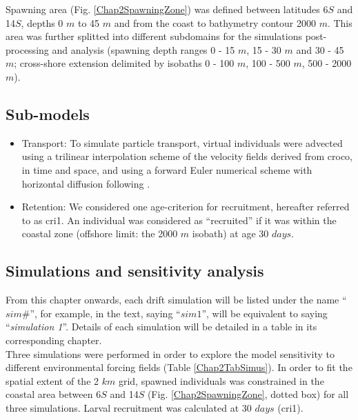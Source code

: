 Spawning area (Fig. \ref{Chap2SpawningZone}) was defined between latitudes 6\textdegree $S$ and 14\textdegree $S$, depths 0 $m$ to 45 $m$ and from the coast to bathymetry contour 2000 $m$. This area was further splitted into different subdomains for the simulations post-processing and analysis (spawning depth ranges 0 - 15 $m$, 15 - 30 $m$ and 30 - 45 $m$; cross-shore extension delimited by isobaths 0 - 100 $m$, 100 - 500 $m$, 500 - 2000 $m$).\\

\subsection{Sub-models}\label{Chap2MethSubMod}

\begin{itemize}

\item Transport: To simulate particle transport, virtual individuals were advected using a trilinear interpolation scheme of the velocity fields derived from \acrshort{croco}, in time and space, and using a forward Euler numerical scheme with horizontal diffusion following \cite{PeliMarc2007}.\\

\item Retention: We considered one age-criterion for recruitment, hereafter referred to as \gls{cri1}. An individual was considered as ``recruited'' if it was within the coastal zone (offshore limit: the 2000 $m$ isobath) at age 30 $days$.\\

\end{itemize}

\subsection{Simulations and sensitivity analysis}\label{Chap2MethSimSens}

From this chapter onwards, each drift simulation will be listed under the name ``\textbf{$sim \#$}'', for example, in the text, saying ``$sim 1$'', will be equivalent to saying ``\textit{simulation 1}''. Details of each simulation will be detailed in a table in its corresponding chapter.\\

Three simulations were performed in order to explore the model sensitivity to different environmental forcing fields (Table \ref{Chap2TabSimus}). In order to fit the spatial extent of the 2 $km$ grid, spawned individuals was constrained in the coastal area between 6\textdegree $S$ and 14\textdegree $S$ (Fig. \ref{Chap2SpawningZone}, dotted box) for all three simulations. Larval recruitment was calculated at 30 $days$ (\gls{cri1}).\\

